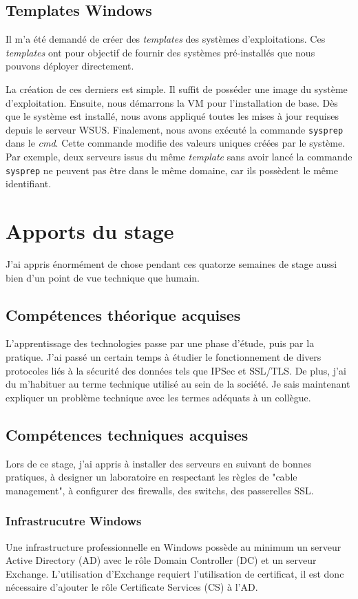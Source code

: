 \subsection{Templates Windows}
Il m'a été demandé de créer des \textit{templates} des systèmes d'exploitations.
Ces \textit{templates} ont pour objectif de fournir des systèmes pré-installés que nous pouvons déployer directement.

La création de ces derniers est simple. 
Il suffit de posséder une image du système d'exploitation.
Ensuite, nous démarrons la VM pour l'installation de base. 
Dès que le système est installé, nous avons appliqué toutes les mises à jour requises depuis le serveur WSUS. 
Finalement, nous avons exécuté la commande \texttt{sysprep} dans le \textit{cmd}.
Cette commande modifie des valeurs uniques créées par le système.
Par exemple, deux serveurs issus du même \textit{template} sans avoir lancé la commande \texttt{sysprep} ne peuvent pas être dans le même domaine, car ils possèdent le même identifiant. 


\section{Apports du stage}
J'ai appris énormément de chose pendant ces quatorze semaines de stage aussi bien d'un point de vue technique que humain.

\subsection{Compétences théorique acquises}
L'apprentissage des technologies passe par une phase d'étude, puis par la pratique.
J'ai passé un certain temps à étudier le fonctionnement de divers protocoles liés à la sécurité des données tels que IPSec et SSL/TLS.
De plus, j'ai du m'habituer au terme technique utilisé au sein de la société.
Je sais maintenant expliquer un problème technique avec les termes adéquats à un collègue.

\subsection{Compétences techniques acquises}
Lors de ce stage, j'ai appris à installer des serveurs en suivant de bonnes pratiques, à designer un laboratoire en respectant les règles de "cable management", à configurer des firewalls, des switchs, des passerelles SSL. 
\subsubsection{Infrastrucutre Windows}
Une infrastructure professionnelle en Windows possède au minimum un serveur Active Directory (AD) avec le rôle Domain Controller (DC) et un serveur Exchange. 
L'utilisation d'Exchange requiert l'utilisation de certificat, il est donc nécessaire d'ajouter le rôle Certificate Services (CS) à l'AD.

